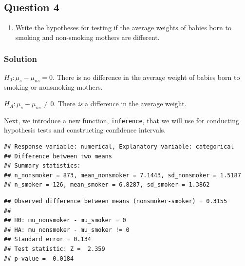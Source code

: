 \documentclass[]{article}
\newenvironment{Shaded}{\begin{snugshade}}{\end{snugshade}}
\newcommand{\KeywordTok}[1]{\textcolor[rgb]{0.13,0.29,0.53}{\textbf{#1}}}
\newcommand{\DataTypeTok}[1]{\textcolor[rgb]{0.13,0.29,0.53}{#1}}
\newcommand{\DecValTok}[1]{\textcolor[rgb]{0.00,0.00,0.81}{#1}}
\newcommand{\StringTok}[1]{\textcolor[rgb]{0.31,0.60,0.02}{#1}}
\newcommand{\OperatorTok}[1]{\textcolor[rgb]{0.81,0.36,0.00}{\textbf{#1}}}
\newcommand{\NormalTok}[1]{#1}
\providecommand{\tightlist}{%
  \setlength{\itemsep}{0pt}\setlength{\parskip}{0pt}}
\begin{document}
\subsection{Question 4}\label{question-4}

\begin{enumerate}
\def\labelenumi{\arabic{enumi}.}
\setcounter{enumi}{3}
\tightlist
\item
  Write the hypotheses for testing if the average weights of babies born
  to smoking and non-smoking mothers are different.
\end{enumerate}

\subsubsection{Solution}\label{solution-3}

\(H_0: \mu_{s} - \mu_{ns} = 0\). There is no difference in the average
weight of babies born to smoking or nonsmoking mothers.

\(H_A: \mu_{s} - \mu_{ns} \neq 0\). There \emph{is} a difference in the
average weight.

Next, we introduce a new function, \texttt{inference}, that we will use
for conducting hypothesis tests and constructing confidence intervals.

\begin{Shaded}
\end{Shaded}

\begin{verbatim}
## Response variable: numerical, Explanatory variable: categorical
## Difference between two means
## Summary statistics:
## n_nonsmoker = 873, mean_nonsmoker = 7.1443, sd_nonsmoker = 1.5187
## n_smoker = 126, mean_smoker = 6.8287, sd_smoker = 1.3862
\end{verbatim}

\begin{verbatim}
## Observed difference between means (nonsmoker-smoker) = 0.3155
## 
## H0: mu_nonsmoker - mu_smoker = 0 
## HA: mu_nonsmoker - mu_smoker != 0 
## Standard error = 0.134 
## Test statistic: Z =  2.359 
## p-value =  0.0184
\end{verbatim}
\end{document}
